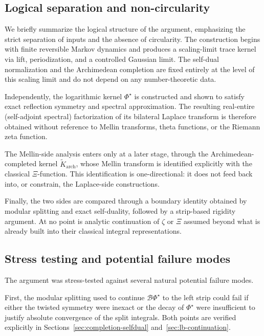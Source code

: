 \documentclass[11pt]{amsart}
\theoremstyle{definition}
\theoremstyle{remark}
\begin{document}
\subsection{Logical separation and non-circularity}

We briefly summarize the logical structure of the argument, emphasizing the strict separation
of inputs and the absence of circularity. The construction begins with finite reversible
Markov dynamics and produces a scaling-limit trace kernel via lift, periodization, and a
controlled Gaussian limit. The self-dual normalization and the Archimedean completion are
fixed entirely at the level of this scaling limit and do not depend on any number-theoretic
data.

Independently, the logarithmic kernel $\Phi^{\star}$ is constructed and shown to satisfy exact
reflection symmetry and spectral approximation. The resulting real-entire (self-adjoint spectral) factorization of its
bilateral Laplace transform is therefore obtained without reference to Mellin transforms,
theta functions, or the Riemann zeta function.

The Mellin-side analysis enters only at a later stage, through the Archimedean-completed kernel
$\widetilde K_{\mathrm{arch}}$, whose Mellin transform is identified explicitly with the
classical $\Xi$-function. This identification is one-directional: it does not feed back into,
or constrain, the Laplace-side constructions.

Finally, the two sides are compared through a boundary identity obtained by modular splitting
and exact self-duality, followed by a strip-based rigidity argument. At no point is analytic
continuation of $\zeta$ or $\Xi$ assumed beyond what is already built into their classical
integral representations.

\subsection{Stress testing and potential failure modes}

The argument was stress-tested against several natural potential failure modes.

First, the modular splitting used to continue $\mathcal B\Phi^{\star}$ to the left strip could
fail if either the twisted symmetry were inexact or the decay of $\Phi^{\star}$ were
insufficient to justify absolute convergence of the split integrals. Both points are verified
explicitly in Sections~\ref{sec:completion-selfdual} and~\ref{sec:lb-continuation}.
\end{document}
